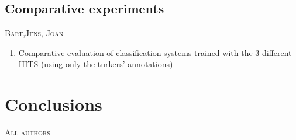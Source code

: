 \documentclass[11pt, a4paper,onecolumn]{article}
\begin{document}
\subsection{Comparative experiments}

\textsc{Bart,Jens, Joan}

\begin{enumerate}
\item Comparative evaluation of classification systems trained with the 3 different HITS (using only the turkers' annotations)
\end{enumerate}

\section{Conclusions}

\textsc{All authors}
\end{document}
